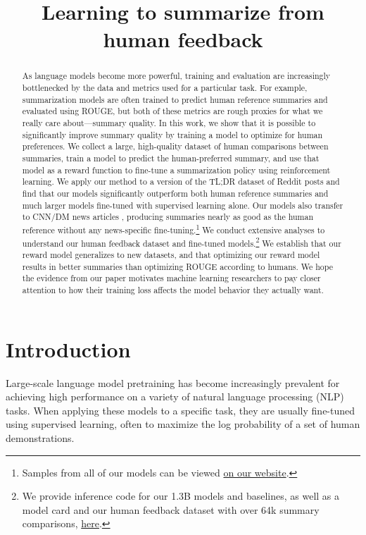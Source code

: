 \title{Learning to summarize from human feedback}

\begin{abstract}
As language models become more powerful, training and evaluation are increasingly bottlenecked by the data and metrics used for a particular task. For example, summarization models are often trained to predict human reference summaries and evaluated using ROUGE, but both of these metrics are rough proxies for what we really care about---summary quality. In this work, we show that it is possible to significantly improve summary quality by training a model to optimize for human preferences.  We collect a large, high-quality dataset of human comparisons between summaries, train a model to predict the human-preferred summary, and use that model as a reward function to fine-tune a summarization policy using reinforcement learning. We apply our method to a version of the TL;DR dataset of Reddit posts \cite{volske2017tl} and find that our models significantly outperform both human reference summaries and much larger models fine-tuned with supervised learning alone. Our models also transfer to CNN/DM news articles \cite{hermann2015teaching}, producing summaries nearly as good as the human reference without any news-specific fine-tuning.\footnote{Samples from all of our models can be viewed \href{https://openaipublic.blob.core.windows.net/summarize-from-feedback/website/index.html}{on our website}.} We conduct extensive analyses to understand our human feedback dataset and fine-tuned models.\footnote{We provide inference code for our 1.3B models and baselines, as well as a model card and our human feedback dataset with over 64k summary comparisons,  \href{https://github.com/openai/summarize-from-feedback}{here}.}
  We establish that our reward model generalizes to new datasets, and that optimizing our reward model results in better summaries than optimizing ROUGE according to humans. We hope the evidence from our paper motivates machine learning researchers to pay closer attention to how their training loss affects the model behavior they actually want.
\end{abstract}

\section{Introduction}
\label{sec:intro}

Large-scale language model pretraining has become increasingly prevalent for achieving high performance on a variety of natural language processing (NLP) tasks. When applying these models to a specific task, they are usually fine-tuned using supervised learning, often to maximize the log probability of a set of human demonstrations.

